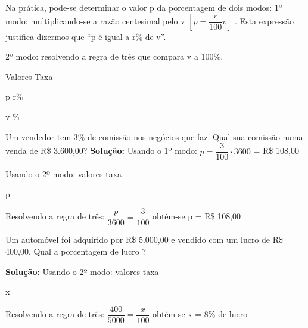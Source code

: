 Na prática, pode-se determinar o valor p da porcentagem de dois modos:
 	1º modo:  multiplicando-se a razão centesimal pelo v $\left[p = \dfrac{r}{100}v\right]$ . Esta expressão justifica dizermos que “p é igual a r\% de v”. 
	
	2º modo: resolvendo a regra de três que compara v a 100\%.

	Valores \quad \quad Taxa

	p \quad \quad \quad r\%

	v \quad \quad {}\%

\begin{texemplo}
Um vendedor tem 3\% de comissão nos negócios que faz. Qual sua comissão numa venda de R\$ 3.600,00?
\textbf{Solução:} Usando o 1º modo: $p = \dfrac{3}{100}\cdot 3600$ =  R\$ 108,00

	Usando o 2º modo:  valores \quad taxa
	
	\quad p \quad \quad \quad 3

	 \quad \quad 100
	
	Resolvendo a regra de três: $\dfrac{p}{3600} = \dfrac{3}{100}$ obtém-se   p = R\$ 108,00  \qedsymbol{}
\end{texemplo}
\begin{texemplo}
	Um automóvel foi adquirido por R\$ 5.000,00 e vendido com um lucro de R\$ 400,00. Qual a porcentagem de lucro ?
		
	\textbf{Solução:} Usando o 2º modo: valores \quad taxa

	 \quad \quad x

	 \quad {}
	
	Resolvendo a regra de três: $\dfrac{400}{5000}=\dfrac{x}{100}$ obtém-se  x = 8\% de lucro \qedsymbol{}
\end{texemplo}
